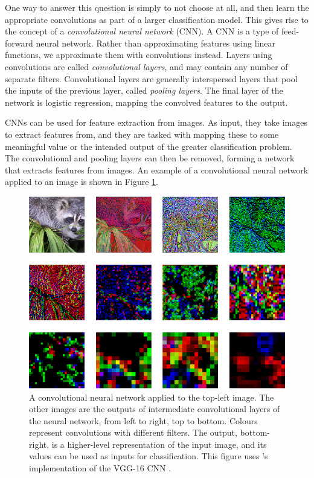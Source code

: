         One way to answer this question is simply to not choose at all, and then
        learn the appropriate convolutions as part of a larger classification
        model. This gives rise to the concept of a \emph{convolutional neural
        network} (CNN). A CNN is a type of feed-forward neural network. Rather
        than approximating features using linear functions, we approximate them
        with convolutions instead. Layers using convolutions are called
        \emph{convolutional layers}, and may contain any number of separate
        filters. Convolutional layers are generally interspersed layers that
        pool the inputs of the previous layer, called \emph{pooling layers}. The
        final layer of the network is logistic regression, mapping the convolved
        features to the output.

        CNNs can be used for feature extraction from images. As input, they take
        images to extract features from, and they are tasked with mapping these
        to some meaningful value or the intended output of the greater
        classification problem. The convolutional and pooling layers can then be
        removed, forming a network that extracts features from images. An
        example of a convolutional neural network applied to an image is shown
        in Figure \ref{fig:face-cnn}.


        \begin{figure}[!ht]
            \centering
            \includegraphics[width=\textwidth]{images/face_cnn.png}
            \caption{A convolutional neural network applied to the top-left
                image. The other images are the outputs of intermediate
                convolutional layers of the neural network, from left to right,
                top to bottom. Colours represent convolutions with different
                filters. The output, bottom-right, is a higher-level
                representation of the input image, and its values can be used as
                inputs for classification. This figure uses
                \citeauthor{baraldi15}'s implementation of the VGG-16 CNN
                \citep{simoyan14}.}
            \label{fig:face-cnn}
        \end{figure}

